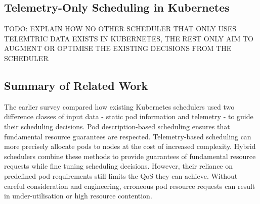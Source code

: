 %
%
%
%
%
%

\subsection{Telemetry-Only Scheduling in Kubernetes}
TODO: EXPLAIN HOW NO OTHER SCHEDULER THAT ONLY USES TELEMTRIC DATA EXISTS IN
KUBERNETES, THE REST ONLY AIM TO AUGMENT OR OPTIMISE THE EXISTING DECISIONS FROM THE SCHEDULER

\subsection{Summary of Related Work}
The earlier survey compared how existing Kubernetes schedulers used two
difference classes of input data - static pod information and telemetry - to
guide their scheduling decisions. Pod description-based scheduling ensures that
fundamental resource guarantees are respected. Telemetry-based scheduling can
more precisely allocate pods to nodes at the cost of increased complexity.
Hybrid schedulers combine these methods to provide guarantees of fundamental
resource requests while fine tuning scheduling decisions. However, their
reliance on predefined pod requirements still limits the QoS they can achieve.
Without careful consideration and engineering, erroneous pod resource requests
can result in under-utilisation or high resource contention.


